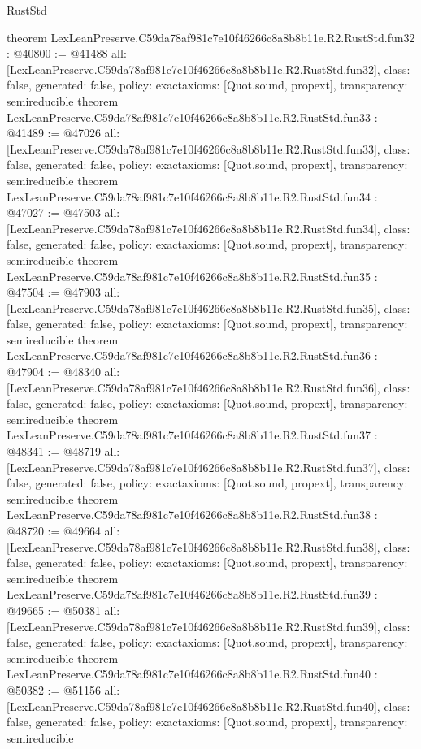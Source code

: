\begin{lexlean}{RustStd}
\begin{coremodule}
{}
theorem LexLeanPreserve.C59da78af981c7e10f46266c8a8b8b11e.R2.RustStd.fun32 : @40800 := @41488 {
  all: [LexLeanPreserve.C59da78af981c7e10f46266c8a8b8b11e.R2.RustStd.fun32],
  class: false,
  generated: false,
  policy: exact{axioms: [Quot.sound, propext]},
  transparency: semireducible
}
theorem LexLeanPreserve.C59da78af981c7e10f46266c8a8b8b11e.R2.RustStd.fun33 : @41489 := @47026 {
  all: [LexLeanPreserve.C59da78af981c7e10f46266c8a8b8b11e.R2.RustStd.fun33],
  class: false,
  generated: false,
  policy: exact{axioms: [Quot.sound, propext]},
  transparency: semireducible
}
theorem LexLeanPreserve.C59da78af981c7e10f46266c8a8b8b11e.R2.RustStd.fun34 : @47027 := @47503 {
  all: [LexLeanPreserve.C59da78af981c7e10f46266c8a8b8b11e.R2.RustStd.fun34],
  class: false,
  generated: false,
  policy: exact{axioms: [Quot.sound, propext]},
  transparency: semireducible
}
theorem LexLeanPreserve.C59da78af981c7e10f46266c8a8b8b11e.R2.RustStd.fun35 : @47504 := @47903 {
  all: [LexLeanPreserve.C59da78af981c7e10f46266c8a8b8b11e.R2.RustStd.fun35],
  class: false,
  generated: false,
  policy: exact{axioms: [Quot.sound, propext]},
  transparency: semireducible
}
theorem LexLeanPreserve.C59da78af981c7e10f46266c8a8b8b11e.R2.RustStd.fun36 : @47904 := @48340 {
  all: [LexLeanPreserve.C59da78af981c7e10f46266c8a8b8b11e.R2.RustStd.fun36],
  class: false,
  generated: false,
  policy: exact{axioms: [Quot.sound, propext]},
  transparency: semireducible
}
theorem LexLeanPreserve.C59da78af981c7e10f46266c8a8b8b11e.R2.RustStd.fun37 : @48341 := @48719 {
  all: [LexLeanPreserve.C59da78af981c7e10f46266c8a8b8b11e.R2.RustStd.fun37],
  class: false,
  generated: false,
  policy: exact{axioms: [Quot.sound, propext]},
  transparency: semireducible
}
theorem LexLeanPreserve.C59da78af981c7e10f46266c8a8b8b11e.R2.RustStd.fun38 : @48720 := @49664 {
  all: [LexLeanPreserve.C59da78af981c7e10f46266c8a8b8b11e.R2.RustStd.fun38],
  class: false,
  generated: false,
  policy: exact{axioms: [Quot.sound, propext]},
  transparency: semireducible
}
theorem LexLeanPreserve.C59da78af981c7e10f46266c8a8b8b11e.R2.RustStd.fun39 : @49665 := @50381 {
  all: [LexLeanPreserve.C59da78af981c7e10f46266c8a8b8b11e.R2.RustStd.fun39],
  class: false,
  generated: false,
  policy: exact{axioms: [Quot.sound, propext]},
  transparency: semireducible
}
theorem LexLeanPreserve.C59da78af981c7e10f46266c8a8b8b11e.R2.RustStd.fun40 : @50382 := @51156 {
  all: [LexLeanPreserve.C59da78af981c7e10f46266c8a8b8b11e.R2.RustStd.fun40],
  class: false,
  generated: false,
  policy: exact{axioms: [Quot.sound, propext]},
  transparency: semireducible
}
\end{coremodule}
\end{lexlean}
